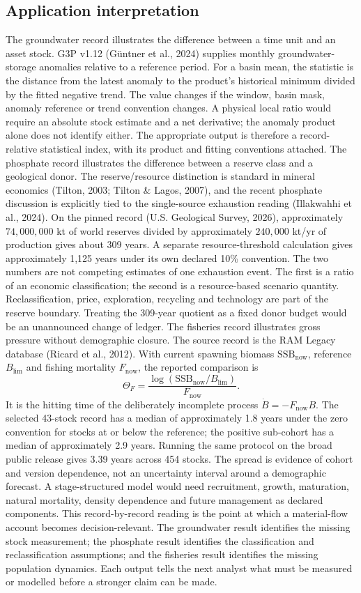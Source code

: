 \documentclass[11pt]{article}
\begin{document}
\subsection{Application interpretation}
The groundwater record illustrates the difference between a time unit and an asset stock. G3P v1.12 (G{\"u}ntner et al., 2024) supplies monthly groundwater-storage anomalies relative to a reference period. For a basin mean, the statistic is the distance from the latest anomaly to the product's historical minimum divided by the fitted negative trend. The value changes if the window, basin mask, anomaly reference or trend convention changes. A physical local ratio would require an absolute stock estimate and a net derivative; the anomaly product alone does not identify either. The appropriate output is therefore a record-relative statistical index, with its product and fitting conventions attached.
The phosphate record illustrates the difference between a reserve class and a geological donor. The reserve/resource distinction is standard in mineral economics (Tilton, 2003; Tilton \& Lagos, 2007), and the recent phosphate discussion is explicitly tied to the single-source exhaustion reading (Illakwahhi et al., 2024). On the pinned record (U.S. Geological Survey, 2026), approximately \(74{,}000{,}000\) kt of world reserves divided by approximately \(240{,}000\) kt/yr of production gives about 309 years. A separate resource-threshold calculation gives approximately 1,125 years under its own declared 10\% convention. The two numbers are not competing estimates of one exhaustion event. The first is a ratio of an economic classification; the second is a resource-based scenario quantity. Reclassification, price, exploration, recycling and technology are part of the reserve boundary. Treating the 309-year quotient as a fixed donor budget would be an unannounced change of ledger.
The fisheries record illustrates gross pressure without demographic closure. The source record is the RAM Legacy database (Ricard et al., 2012). With current spawning biomass \(\mathrm{SSB}_{\mathrm{now}}\), reference \(B_{\lim}\) and fishing mortality \(F_{\mathrm{now}}\), the reported comparison is
\[\Theta_F=\frac{\log(\mathrm{SSB}_{\mathrm{now}}/B_{\lim})}{F_{\mathrm{now}}}.\]
It is the hitting time of the deliberately incomplete process \(\dot B=-F_{\mathrm{now}}B\). The selected 43-stock record has a median of approximately 1.8 years under the zero convention for stocks at or below the reference; the positive sub-cohort has a median of approximately 2.9 years. Running the same protocol on the broad public release gives 3.39 years across 454 stocks. The spread is evidence of cohort and version dependence, not an uncertainty interval around a demographic forecast. A stage-structured model would need recruitment, growth, maturation, natural mortality, density dependence and future management as declared components.
This record-by-record reading is the point at which a material-flow account becomes decision-relevant. The groundwater result identifies the missing stock measurement; the phosphate result identifies the classification and reclassification assumptions; and the fisheries result identifies the missing population dynamics. Each output tells the next analyst what must be measured or modelled before a stronger claim can be made.
\end{document}
